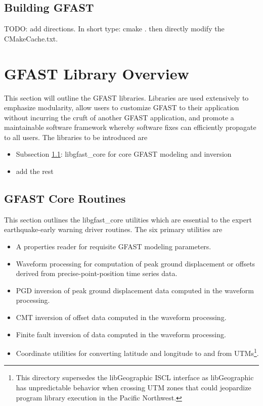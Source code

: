 \documentclass[12pt]{article}
\begin{document}
\subsection{Building GFAST}

TODO: add directions.  In short type: cmake . then directly modify the CMakeCache.txt.  

\clearpage
\section{GFAST Library Overview}
This section will outline the GFAST libraries.  Libraries are used extensively 
to emphasize modularity, allow users to customize GFAST to their application 
without incurring the cruft of another GFAST application, and promote a maintainable
software framework whereby software fixes can efficiently propagate to all users.  
The libraries to be introduced are
\begin{itemize}
 \item Subsection \ref{ss:gfastCore}: libgfast\_core for core GFAST modeling and inversion  
 \item add the rest
\end{itemize}

\clearpage
\subsection{GFAST Core Routines}\label{ss:gfastCore}
This section outlines the libgfast\_core utilities which are essential to the expert
earthquake-early warning driver routines.  The six primary utilities are
\begin{itemize}
  \item A properties reader for requisite GFAST modeling parameters.
  \item Waveform processing for computation of peak ground displacement or offsets
  derived from precise-point-position time series data.
  \item PGD inversion of peak ground displacement data computed in the waveform processing.
  \item CMT inversion of offset data computed in the waveform processing.
  \item Finite fault inversion of data computed in the waveform processing.
  \item Coordinate utilities for converting latitude and longitude to and from 
  UTMs\footnote{This directory supersedes the libGeographic ISCL interface as libGeographic 
            has unpredictable behavior when crossing UTM zones that could jeopardize
            program library execution in the Pacific Northwest.}.  
\end{itemize}
\end{document}

